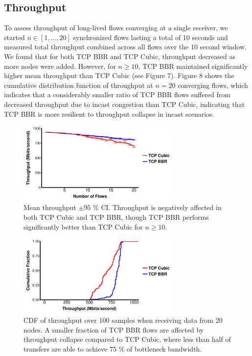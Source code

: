\documentclass[letterpaper,twocolumn,10pt]{article}
\begin{document}
\subsection{Throughput}

To assess throughput of long-lived flows converging at a single receiver, we started $n \in [1, ..., 20]$ synchronized flows lasting a total of 10 seconds and measured total throughput combined across all flows over the 10 second window. We found that for both TCP BBR and TCP Cubic, throughput decreased as more nodes were added. However, for $n \geq 10$, TCP BBR maintained significantly higher mean throughput than TCP Cubic (see Figure 7). Figure 8 shows the cumulative distribution function of throughput at $n = 20$ converging flows, which indicates that a considerably smaller ratio of TCP BBR flows suffered from decreased throughput due to incast congestion than TCP Cubic, indicating that TCP BBR is more resilient to throughput collapse in incast scenarios. 

\begin{figure}
\includegraphics[height=1.6in,width=3.2in]{plots/thru_avg.pdf}
\caption{Mean throughput $\pm 95$ $\%$ CI. Throughput is negatively affected in both TCP Cubic and TCP BBR, though TCP BBR performs significantly better than TCP Cubic for $n \geq 10$.}
\end{figure}

\begin{figure}
\includegraphics[height=1.6in,width=3.2in]{plots/thru_cdf.pdf}
\caption{CDF of throughput over 100 samples when receiving data from 20 nodes. A smaller fraction of TCP BBR flows are affected by throughput collapse compared to TCP Cubic, where less than half of transfers are able to achieve 75 \% of bottleneck bandwidth.}
\end{figure}
\end{document}
